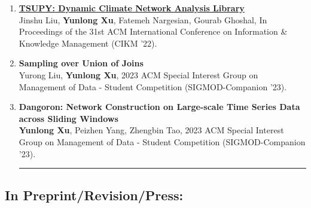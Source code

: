 \documentclass[10pt,letterpaper]{article}
\begin{document}
\begin{enumerate}
\item \textbf{\href{https://dl.acm.org/doi/abs/10.1145/3511808.3557166}{TSUPY: Dynamic Climate Network Analysis Library}}\\
Jinshu Liu, \textbf{Yunlong Xu}, Fatemeh Nargesian, Gourab Ghoshal,  In Proceedings of the 31st ACM International Conference on Information \& Knowledge Management (CIKM '22). \\


\item \textbf{ Sampling over Union of Joins}\\
Yurong Liu, \textbf{Yunlong Xu},  2023 ACM Special Interest Group on Management of Data - Student Competition (SIGMOD-Companion ’23).\\


\item \textbf{ Dangoron: Network Construction on Large-scale Time Series Data across Sliding Windows}\\
\textbf{Yunlong Xu}, Peizhen Yang, Zhengbin Tao,  2023 ACM Special Interest Group on Management of Data - Student Competition (SIGMOD-Companion ’23).\\


\vspace{2mm}
\hrule

\end{enumerate}


\subsection{In Preprint/Revision/Press:}
\end{document}
